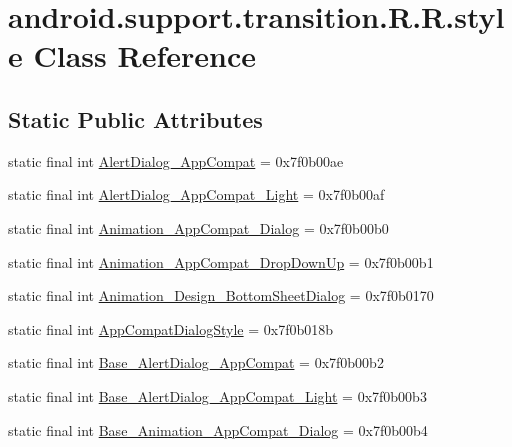 \hypertarget{classandroid_1_1support_1_1transition_1_1_r_1_1style}{
\section{android.support.transition.R.R.style Class Reference}
\label{classandroid_1_1support_1_1transition_1_1_r_1_1style}
}
\subsection*{Static Public Attributes}
\begin{CompactItemize}
\item 
static final int \hyperlink{classandroid_1_1support_1_1transition_1_1_r_1_1style_340cb4eb4467b2140f9666f91764533e}{AlertDialog\_\-AppCompat} = 0x7f0b00ae
\item 
static final int \hyperlink{classandroid_1_1support_1_1transition_1_1_r_1_1style_2df4ef07844a3d8840e688c1e21f2174}{AlertDialog\_\-AppCompat\_\-Light} = 0x7f0b00af
\item 
static final int \hyperlink{classandroid_1_1support_1_1transition_1_1_r_1_1style_0fe96db444b5dee13d0635d10cf049f1}{Animation\_\-AppCompat\_\-Dialog} = 0x7f0b00b0
\item 
static final int \hyperlink{classandroid_1_1support_1_1transition_1_1_r_1_1style_7548569faba6369abe70bcd37ed10785}{Animation\_\-AppCompat\_\-DropDownUp} = 0x7f0b00b1
\item 
static final int \hyperlink{classandroid_1_1support_1_1transition_1_1_r_1_1style_d665256bb0d2e0934072088feb376249}{Animation\_\-Design\_\-BottomSheetDialog} = 0x7f0b0170
\item 
static final int \hyperlink{classandroid_1_1support_1_1transition_1_1_r_1_1style_c89d022571a8201a3ad3e8a10c9d7be1}{AppCompatDialogStyle} = 0x7f0b018b
\item 
static final int \hyperlink{classandroid_1_1support_1_1transition_1_1_r_1_1style_f0a3f6cbbffd252cd2fef8a709d95f77}{Base\_\-AlertDialog\_\-AppCompat} = 0x7f0b00b2
\item 
static final int \hyperlink{classandroid_1_1support_1_1transition_1_1_r_1_1style_e3785bafe2b0b43e6bea46fa5517201f}{Base\_\-AlertDialog\_\-AppCompat\_\-Light} = 0x7f0b00b3
\item 
static final int \hyperlink{classandroid_1_1support_1_1transition_1_1_r_1_1style_15d134c346ce6d1a5b205ebcebb837f0}{Base\_\-Animation\_\-AppCompat\_\-Dialog} = 0x7f0b00b4
\item 

\end{CompactItemize}
